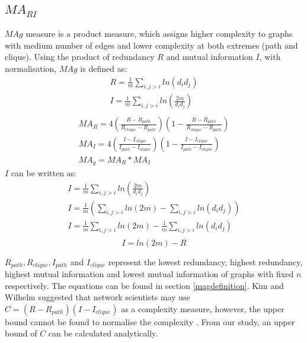 \documentclass[12pt]{article}
\begin{document}
\subsection{$MA_{RI}$}
$MAg$ measure is a product measure, which assigns higher complexity to graphs with medium number of edges and lower complexity at both extremes (path and clique). Using the product of redundancy $R$ and mutual information $I$, with normalisation, $MAg$ is defined as\cite{KIM20082637}:
\begin{equation}
    \label{eq:RandI}
    \begin{gathered}
        R = \frac{1}{m}\sum_{i,j>i}ln(d_id_j)\\
        I = \frac{1}{m}\sum_{i,j>i}ln(\frac{2m}{d_id_j})\\
    \end{gathered}
\end{equation}
\begin{equation}
    \label{eq:mag}
    \begin{gathered}
        MA_R = 4(\frac{R-R_{path}}{R_{clique}-R_{path}})(1-\frac{R-R_{path}}{R_{clique}-R_{path}})\\
        MA_I = 4(\frac{I-I_{clique}}{I_{path}-I_{clique}})(1-\frac{I-I_{clique}}{I_{path}-I_{clique}})\\
        MA_g = MA_R * MA_I
    \end{gathered}
\end{equation}
$I$ can be written as:
\begin{equation}
    \begin{gathered}
        \label{eq:rewriteI}
        I = \frac{1}{m}\sum_{i,j>i}ln(\frac{2m}{d_id_j})\\
        I = \frac{1}{m}(\sum_{i,j>i}ln(2m)-\sum_{i,j>i}ln(d_id_j))\\
        I = \frac{1}{m}\sum_{i,j>i}ln(2m)-\frac{1}{m}\sum_{i,j>i}ln(d_id_j)\\
    \end{gathered}
\end{equation}
\begin{equation}
    \label{eq:mutual_info}
    I = ln(2m)-R
\end{equation}
\par
$R_{path},R_{clique},I_{path}$ and $I_{clique}$ represent the lowest redundancy, highest redundancy, highest mutual information and lowest mutual information of graphs with fixed $n$ respectively. The equations can be found in section \ref{magdefinition}. Kim and Wilhelm suggested that network scientists may use $C=(R-R_{path})(I-I_{clique})$ as a complexity measure, however, the upper bound cannot be found to normalise the complexity \cite{KIM20082637}. From our study, an upper bound of $C$ can be calculated analytically.\par
\end{document}
